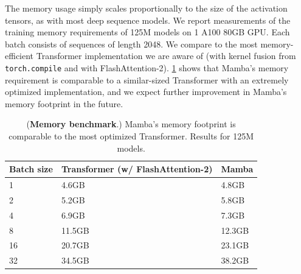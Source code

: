 The memory usage simply scales proportionally to the size of the activation tensors, as with most deep sequence models. We report measurements of the training memory requirements of 125M models on 1 A100 80GB GPU. Each batch consists of sequences of length 2048. We compare to the most memory-efficient Transformer implementation we are aware of (with kernel fusion from \texttt{torch.compile} and with FlashAttention-2).
\cref{tab:memory} shows that Mamba's memory requirement is comparable to a similar-sized Transformer with an extremely optimized implementation, and we expect further improvement in Mamba's memory footprint in the future.

\begin{table}
  \caption{(\textbf{Memory benchmark}.) Mamba's memory footprint is comparable to the most optimized Transformer. Results for 125M models.}
  \centering
  \begin{tabular}{@{}lll@{}}
    \toprule
    Batch size & Transformer (w/ FlashAttention-2) & Mamba  \\
    \midrule
    1          & 4.6GB                             & 4.8GB  \\
    2          & 5.2GB                             & 5.8GB  \\
    4          & 6.9GB                             & 7.3GB  \\
    8          & 11.5GB                            & 12.3GB \\
    16         & 20.7GB                            & 23.1GB \\
    32         & 34.5GB                            & 38.2GB \\
    \bottomrule
  \end{tabular}
  \label{tab:memory}
\end{table}


